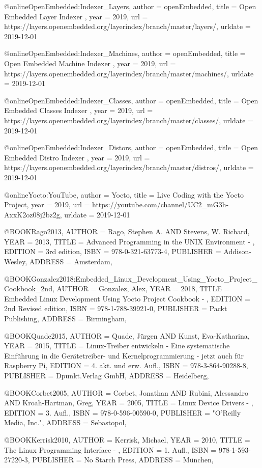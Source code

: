 @online{OpenEmbedded:Indexer_Layers,
author = {openEmbedded},
title = {Open Embedded Layer Indexer },
year = 2019,
url = {https://layers.openembedded.org/layerindex/branch/master/layers/},
urldate = {2019-12-01}
}


@online{OpenEmbedded:Indexer_Machines,
author = {openEmbedded},
title = {Open Embedded Machine Indexer },
year = 2019,
url = {https://layers.openembedded.org/layerindex/branch/master/machines/},
urldate = {2019-12-01}
}

@online{OpenEmbedded:Indexer_Classes,
author = {openEmbedded},
title = {Open Embedded Classes Indexer },
year = 2019,
url = {https://layers.openembedded.org/layerindex/branch/master/classes/},
urldate = {2019-12-01}
}

@online{OpenEmbedded:Indexer_Distors,
author = {openEmbedded},
title = {Open Embedded Distro Indexer },
year = 2019,
url = {https://layers.openembedded.org/layerindex/branch/master/distros/},
urldate = {2019-12-01}
}

@online{Yocto:YouTube,
author = {Yocto},
title = {Live Coding with the Yocto Project},
year = 2019,
url = {https://youtube.com/channel/UC2_mG3h-AxxK2oz08j2bz2g},
urldate = {2019-12-01}
}

@BOOK{Rago2013,
	AUTHOR = {Rago, Stephen A. AND Stevens, W. Richard},
	YEAR = {2013},
	TITLE = {Advanced Programming in the UNIX Environment - },
	EDITION = {3rd edition},
	ISBN = {978-0-321-63773-4},
	PUBLISHER = {Addison-Wesley},
	ADDRESS = {Amsterdam},
}


@BOOK{Gonzalez2018:Embedded_Linux_Development_Using_Yocto_Project_Cookbook_2nd,
	AUTHOR = {Gonzalez, Alex},
	YEAR = {2018},
	TITLE = {Embedded Linux Development Using Yocto Project Cookbook - },
	EDITION = {2nd Revised edition},
	ISBN = {978-1-788-39921-0},
	PUBLISHER = {Packt Publishing},
	ADDRESS = {Birmingham},
}


@BOOK{Quade2015,
	AUTHOR = {Quade, Jürgen AND Kunst, Eva-Katharina},
	YEAR = {2015},
	TITLE = {Linux-Treiber entwickeln - Eine systematische Einführung in die Gerätetreiber- und Kernelprogrammierung - jetzt auch für Raspberry Pi},
	EDITION = {4. akt. und erw. Aufl.},
	ISBN = {978-3-864-90288-8},
	PUBLISHER = {Dpunkt.Verlag GmbH},
	ADDRESS = {Heidelberg},
}


@BOOK{Corbet2005,
	AUTHOR = {Corbet, Jonathan AND Rubini, Alessandro AND Kroah-Hartman, Greg},
	YEAR = {2005},
	TITLE = {Linux Device Drivers - },
	EDITION = {3. Aufl.},
	ISBN = {978-0-596-00590-0},
	PUBLISHER = {"O'Reilly Media, Inc."},
	ADDRESS = {Sebastopol},
}

@BOOK{Kerrisk2010,
	AUTHOR = {Kerrisk, Michael},
	YEAR = {2010},
	TITLE = {The Linux Programming Interface - },
	EDITION = {1. Aufl.},
	ISBN = {978-1-593-27220-3},
	PUBLISHER = {No Starch Press},
	ADDRESS = {München},
}



